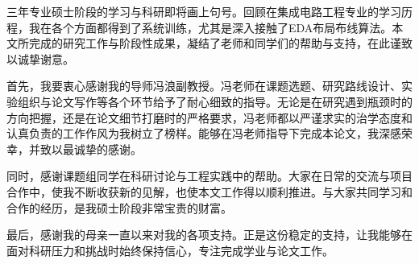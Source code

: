 
\begin{acknowledgements}

    三年专业硕士阶段的学习与科研即将画上句号。回顾在集成电路工程专业的学习历程，我在各个方面都得到了系统训练，尤其是深入接触了EDA布局布线算法。本文所完成的研究工作与阶段性成果，凝结了老师和同学们的帮助与支持，在此谨致以诚挚谢意。

    首先，我要衷心感谢我的导师冯浪副教授。冯老师在课题选题、研究路线设计、实验组织与论文写作等各个环节给予了耐心细致的指导。无论是在研究遇到瓶颈时的方向把握，还是在论文细节打磨时的严格要求，冯老师都以严谨求实的治学态度和认真负责的工作作风为我树立了榜样。能够在冯老师指导下完成本论文，我深感荣幸，并致以最诚挚的感谢。

    同时，感谢课题组同学在科研讨论与工程实践中的帮助。大家在日常的交流与项目合作中，使我不断收获新的见解，也使本文工作得以顺利推进。与大家共同学习和合作的经历，是我硕士阶段非常宝贵的财富。

    最后，感谢我的母亲一直以来对我的各项支持。正是这份稳定的支持，让我能够在面对科研压力和挑战时始终保持信心，专注完成学业与论文工作。

\end{acknowledgements}
